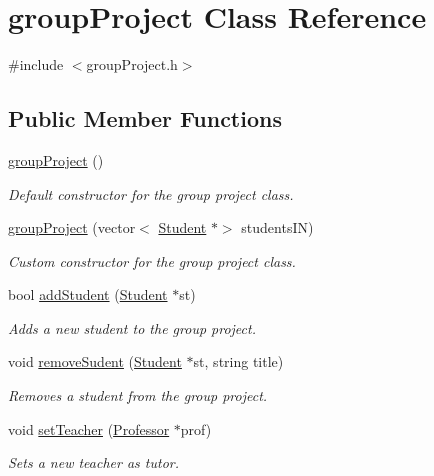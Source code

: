 \hypertarget{classgroup_project}{}\section{group\+Project Class Reference}
\label{classgroup_project}


{\ttfamily \#include $<$group\+Project.\+h$>$}

\subsection*{Public Member Functions}
\begin{DoxyCompactItemize}
\item 
\hyperlink{classgroup_project_ac96fe662ac0954e7a0d055ad5d52d324}{group\+Project} ()
\begin{DoxyCompactList}\small\item\em Default constructor for the group project class. \end{DoxyCompactList}\item 
\hyperlink{classgroup_project_a6d21dcbab960c214631ddc4506351372}{group\+Project} (vector$<$ \hyperlink{class_student}{Student} $\ast$$>$ students\+IN)
\begin{DoxyCompactList}\small\item\em Custom constructor for the group project class. \end{DoxyCompactList}\item 
bool \hyperlink{classgroup_project_ab4e0a6d2a9add0cf2399674540ffb141}{add\+Student} (\hyperlink{class_student}{Student} $\ast$st)
\begin{DoxyCompactList}\small\item\em Adds a new student to the group project. \end{DoxyCompactList}\item 
void \hyperlink{classgroup_project_a70388668e291a41025fdd3975f529bae}{remove\+Sudent} (\hyperlink{class_student}{Student} $\ast$st, string title)
\begin{DoxyCompactList}\small\item\em Removes a student from the group project. \end{DoxyCompactList}\item 
void \hyperlink{classgroup_project_a12367c1192c7665efcbca4033905aeff}{set\+Teacher} (\hyperlink{class_professor}{Professor} $\ast$prof)
\begin{DoxyCompactList}\small\item\em Sets a new teacher as tutor. \end{DoxyCompactList}\item 
$$
\end{DoxyCompactItemize}
